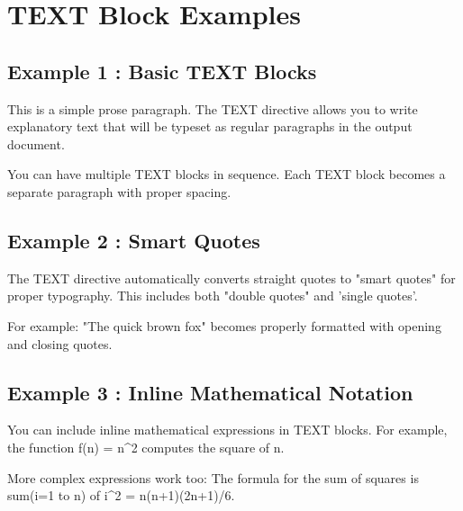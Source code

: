 \documentclass[a4paper,10pt,fleqn]{article}
\begin{document}
\section*{TEXT Block Examples}

\subsection*{Example 1 : Basic TEXT Blocks}

\noindent This is a simple prose paragraph. The TEXT directive allows you to write explanatory text that will be typeset as regular paragraphs in the output document.

\bigskip

\noindent You can have multiple TEXT blocks in sequence. Each TEXT block becomes a separate paragraph with proper spacing.

\bigskip

\subsection*{Example 2 : Smart Quotes}

\noindent The TEXT directive automatically converts straight quotes to "smart quotes" for proper typography. This includes both "double quotes" and 'single quotes'.

\bigskip

\noindent For example: "The quick brown fox" becomes properly formatted with opening and closing quotes.

\bigskip

\subsection*{Example 3 : Inline Mathematical Notation}

\noindent You can include inline mathematical expressions in TEXT blocks. For example, the function f(n) = n\textasciicircum{}2 computes the square of n.

\bigskip

\noindent More complex expressions work too: The formula for the sum of squares is sum(i=1 to n) of i\textasciicircum{}2 = n(n+1)(2n+1)/6.

\bigskip
\end{document}
